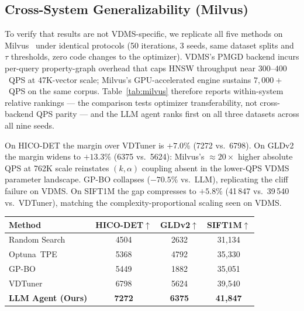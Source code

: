 \documentclass[sigconf, nonacm]{acmart}
\theoremstyle{definition}
\begin{document}
\subsection{Cross-System Generalizability (Milvus)}
\label{sec:milvus}

To verify that results are not VDMS-specific, we replicate all five methods on
Milvus~\cite{wang2021milvus} under identical protocols (50 iterations, 3 seeds,
same dataset splits and $\tau$ thresholds, zero code changes to the optimizer).
VDMS's PMGD backend incurs per-query property-graph overhead that caps HNSW
throughput near $300$--$400$~QPS at 47K-vector scale; Milvus's GPU-accelerated
engine sustains $7{,}000+$~QPS on the same corpus.
Table~\ref{tab:milvus} therefore reports within-system relative rankings ---
the comparison tests optimizer transferability, not cross-backend QPS parity ---
and the LLM agent ranks first on all three datasets across all nine seeds.

On HICO-DET the margin over VDTuner is $+7.0\%$ (7272 vs.\ 6798).
On GLDv2 the margin widens to $+13.3\%$ (6375 vs.\ 5624): Milvus's ${\approx}20{\times}$
higher absolute QPS at 762K scale reinstates $(k,\alpha)$ coupling absent in the
lower-QPS VDMS parameter landscape.
GP-BO collapses ($-70.5\%$ vs.\ LLM), replicating the cliff failure on VDMS.
On SIFT1M the gap compresses to $+5.8\%$ (41\,847 vs.\ 39\,540 vs.\ VDTuner),
matching the complexity-proportional scaling seen on VDMS.

\begingroup
\small
\setlength{\tabcolsep}{4pt}
\label{tab:milvus}
\setlength{\topsep}{0pt}\setlength{\partopsep}{0pt}%
\begin{center}
\begin{tabular}{lccc}
\toprule
\textbf{Method} & \textbf{HICO-DET}$\uparrow$ & \textbf{GLDv2}$\uparrow$ & \textbf{SIFT1M}$\uparrow$ \\
\midrule
Random Search~\cite{bergstra2012random} & 4504          & 2632          & 31{,}134 \\
Optuna~TPE~\cite{akiba2019optuna}       & 5368          & 4792          & 35{,}330 \\
GP-BO~\cite{snoek2012bayesian}          & 5449          & 1882          & 35{,}051 \\
VDTuner~\cite{yang2024vdtuner}          & 6798          & 5624          & 39{,}540 \\
\midrule
\textbf{LLM Agent (Ours)} & \textbf{7272} & \textbf{6375} & \textbf{41{,}847} \\
\bottomrule
\end{tabular}
\end{center}
\endgroup
\end{document}
